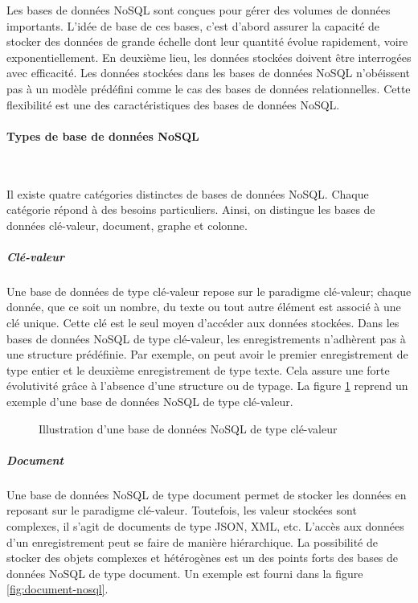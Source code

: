 	
	Les bases de données NoSQL sont conçues pour gérer des  volumes de données importants. L'idée de base de ces bases, c'est d'abord assurer la capacité de stocker des données de grande échelle dont leur  quantité  évolue rapidement, voire exponentiellement.  En deuxième lieu, les données stockées  doivent être interrogées  avec efficacité. Les données stockées dans  les bases de données NoSQL n'obéissent pas à un modèle prédéfini comme le cas des bases de données relationnelles. Cette flexibilité est une des caractéristiques des bases de données NoSQL.
	
	
	\paragraph{Types de base de données NoSQL}   ~
	
	Il existe quatre catégories distinctes de bases de données NoSQL. Chaque catégorie répond  à des besoins particuliers. Ainsi, on distingue les bases de données clé-valeur, document, graphe et colonne.
	
	


	\subparagraph {Clé-valeur} Une base de données de type clé-valeur repose sur le paradigme clé-valeur; chaque donnée, que ce soit un nombre, du texte ou tout autre élément est associé à une clé unique. Cette clé est le seul moyen d'accéder aux données stockées.
	Dans les bases de données NoSQL de type clé-valeur, les enregistrements  n'adhèrent pas à une structure prédéfinie. Par exemple, on peut avoir le premier enregistrement de type entier et le deuxième enregistrement de type texte. Cela assure une forte évolutivité grâce à l'absence d'une structure ou de typage. La figure \ref{fig:key-value-nosql} reprend un exemple d'une base de données NoSQL de type clé-valeur.

	
	\begin{figure}[H]
		\captionsetup{justification=centering}
		\centering
		\resizebox{!}{!}{
			
	    }
		\caption{Illustration d'une base de données NoSQL de type clé-valeur}
		\label{fig:key-value-nosql}
	\end{figure}
	

		\subparagraph{Document} Une base de données NoSQL de type document permet de stocker les données en reposant sur le paradigme clé-valeur. Toutefois, les valeur stockées sont complexes, il s'agit de documents de type JSON, XML, etc. L'accès aux données d'un enregistrement peut se faire de manière hiérarchique. La possibilité de stocker des objets complexes et hétérogènes  est un des points forts des bases de données NoSQL de type  document. Un exemple est fourni dans la figure \ref{fig:document-nosql}.
		

